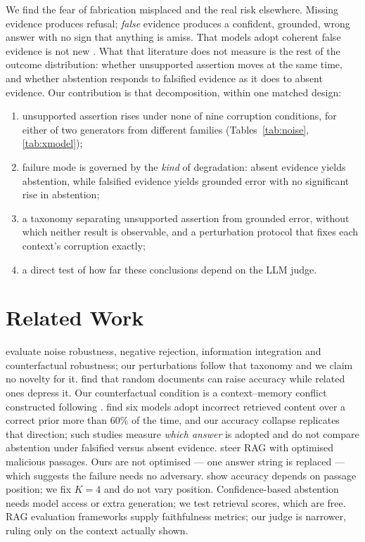 \documentclass[11pt]{article}
\begin{document}
We find the fear of fabrication misplaced and the real risk elsewhere. Missing
evidence produces refusal; \emph{false} evidence produces a confident, grounded, wrong
answer with no sign that anything is amiss. That models adopt coherent false evidence
is not new \citep{xie2024chameleon,wu2024clasheval}. What that literature does not
measure is the rest of the outcome distribution: whether unsupported assertion moves
at the same time, and whether abstention responds to falsified evidence as it does to
absent evidence. Our contribution is that decomposition, within one matched design:
\begin{enumerate}\itemsep0pt
\item unsupported assertion rises under none of nine corruption conditions, for
      either of two generators from different families (Tables~\ref{tab:noise},
      \ref{tab:xmodel});
\item failure mode is governed by the \emph{kind} of degradation: absent evidence
      yields abstention, while falsified evidence yields grounded error with no
      significant rise in abstention;
\item a taxonomy separating unsupported assertion from grounded error, without which
      neither result is observable, and a perturbation protocol that fixes each
      context's corruption exactly;
\item a direct test of how far these conclusions depend on the LLM judge.
\end{enumerate}

\section{Related Work}
\citet{chen2024rgb} evaluate noise robustness, negative rejection, information
integration and counterfactual robustness; our perturbations follow that taxonomy and
we claim no novelty for it. \citet{cuconasu2024noise} find that random documents can
raise accuracy while related ones depress it. Our counterfactual condition is a
context--memory conflict \citep{xu2024conflictsurvey} constructed following
\citet{longpre2021conflicts}. \citet{wu2024clasheval} find six models adopt incorrect
retrieved content over a correct prior more than 60\% of the time, and our accuracy
collapse replicates that direction; such studies measure \emph{which answer} is
adopted and do not compare abstention under falsified versus absent evidence.
\citet{zou2025poisonedrag} steer RAG with optimised malicious passages. Ours are not
optimised --- one answer string is replaced --- which suggests the failure needs no
adversary. \citet{liu2024lost} show accuracy depends on passage position; we fix
$K{=}4$ and do not vary position. Confidence-based abstention
\citep{kadavath2022know,asai2024selfrag} needs model access or extra generation; we
test retrieval scores, which are free. RAG evaluation frameworks
\citep{es2024ragas,saadfalcon2024ares} supply faithfulness metrics; our judge is
narrower, ruling only on the context actually shown.
\end{document}
